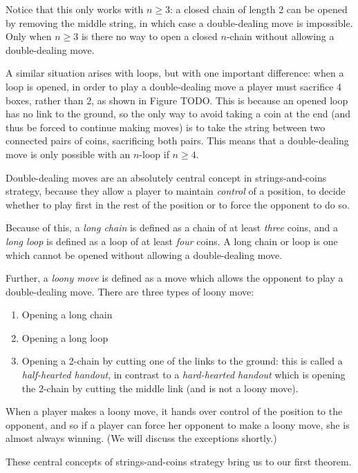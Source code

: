\documentclass[a4paper,twocolumn]{article}
\begin{document}
Notice that this only works with $n \ge 3$: a closed chain of length 2
can be opened by removing the middle string, in which case a
double-dealing move is impossible. Only when $n \ge 3$ is there no way
to open a closed $n$-chain without allowing a double-dealing move.

A similar situation arises with loops, but with one important
difference: when a loop is opened, in order to play a double-dealing
move a player must sacrifice 4 boxes, rather than 2, as shown in
Figure TODO. This is because an opened loop has no link to the ground,
so the only way to avoid taking a coin at the end (and thus be forced
to continue making moves) is to take the string between two connected
pairs of coins, sacrificing both pairs. This means that a
double-dealing move is only possible with an $n$-loop if $n \ge 4$.

Double-dealing moves are an absolutely central concept in
strings-and-coins strategy, because they allow a player to maintain
\emph{control} of a position, to decide whether to play first in the
rest of the position or to force the opponent to do so.

Because of this, a \emph{long chain} is defined as a chain of at least
\emph{three} coins, and a \emph{long loop} is defined as a loop of at
least \emph{four} coins. A long chain or loop is one which cannot be
opened without allowing a double-dealing move.

Further, a \emph{loony move} is defined as a move which allows the
opponent to play a double-dealing move. There are three types of loony
move:

\begin{enumerate}
  \item Opening a long chain
  \item Opening a long loop
  \item Opening a 2-chain by cutting one of the links to the ground:
    this is called a \emph{half-hearted handout}, in contrast to a
    \emph{hard-hearted handout} which is opening the 2-chain by
    cutting the middle link (and is not a loony move).
\end{enumerate}

When a player makes a loony move, it hands over control of the
position to the opponent, and so if a player can force her opponent to
make a loony move, she is almost always winning. (We will discuss the
exceptions shortly.)

These central concepts of strings-and-coins strategy bring us to our
first theorem.
\end{document}

